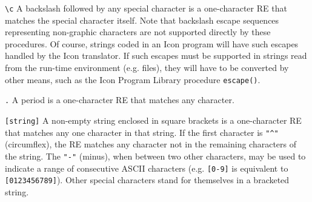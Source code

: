 \texttt{{\textbackslash}c} A backslash followed by any special character
is a one-character RE that matches the special character itself. Note
that backslash escape sequences representing non-graphic characters are
not supported directly by these procedures. Of course, strings coded in
an Icon program will have such escapes handled by the Icon translator.
If such escapes must be supported in strings read from the run-time
environment (e.g. files), they will have to be converted by other
means, such as the Icon Program Library procedure \texttt{escape()}.

\texttt{.} A period is a one-character RE that matches any character.

\texttt{[string]} A non-empty string enclosed in square brackets is a
one-character RE that matches any one character in that string. If the
first character is \texttt{"\^{}"}
(circumflex), the RE matches any character not in the remaining
characters of the string. The \texttt{"-"}
(minus), when between two other characters, may be used to indicate a
range of consecutive ASCII characters (e.g. \texttt{[0-9]}
is equivalent to \texttt{[0123456789]}). Other special characters stand
for themselves in a bracketed string.

